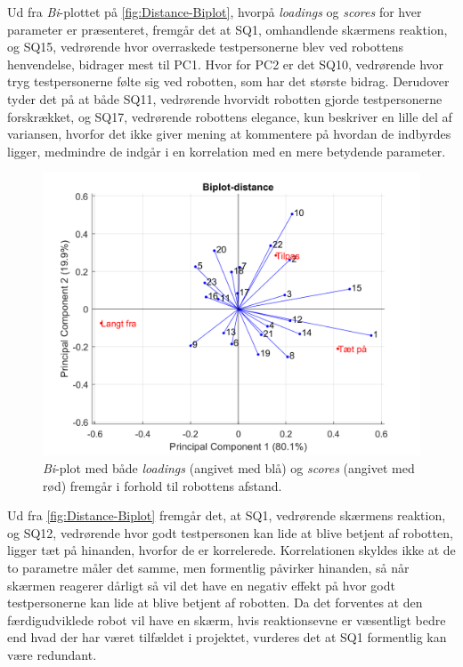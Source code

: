 Ud fra \textit{Bi}-plottet på \autoref{fig:Distance-Biplot}, hvorpå \textit{loadings} og \textit{scores} for hver parameter er præsenteret, fremgår det at SQ1, omhandlende skærmens reaktion, og SQ15, vedrørende hvor overraskede testpersonerne blev ved robottens henvendelse, bidrager mest til PC1. Hvor for PC2 er det SQ10, vedrørende hvor tryg testpersonerne følte sig ved robotten, som har det største bidrag. Derudover tyder det på at både SQ11, vedrørende hvorvidt robotten gjorde testpersonerne forskrækket, og SQ17, vedrørende robottens elegance, kun beskriver en lille del af variansen, hvorfor det ikke giver mening at kommentere på hvordan de indbyrdes ligger, medmindre de indgår i en korrelation med en mere betydende parameter.   
%
\begin{figure}[H]
\centering
\includegraphics[width=\textwidth]{Figure/DatabehandlingSkalaer/PCAfigures/Distance-Biplot.png}
\caption{\textit{Bi}-plot med både \textit{loadings} (angivet med blå) og \textit{scores} (angivet med rød) fremgår i forhold til robottens afstand.}
\label{fig:Distance-Biplot}
\end{figure}
\noindent
%
Ud fra \autoref{fig:Distance-Biplot} fremgår det, at SQ1, vedrørende skærmens reaktion, og SQ12, vedrørende hvor godt testpersonen kan lide at blive betjent af robotten, ligger tæt på hinanden, hvorfor de er korrelerede. Korrelationen skyldes ikke at de to parametre måler det samme, men formentlig påvirker hinanden, så når skærmen reagerer dårligt så vil det have en negativ effekt på hvor godt testpersonerne kan lide at blive betjent af robotten. Da det forventes at den færdigudviklede robot vil have en skærm, hvis reaktionsevne er væsentligt bedre end hvad der har været tilfældet i projektet, vurderes det at SQ1 formentlig kan være redundant. 


